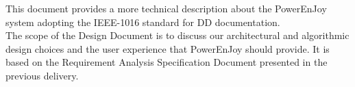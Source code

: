 This document provides a more technical description about the PowerEnJoy system adopting the IEEE-1016 standard for DD documentation.
\\The scope of the Design Document is to discuss our architectural and algorithmic design choices and the user experience that PowerEnJoy should provide. It is based on the Requirement Analysis Specification Document presented in the previous delivery.
